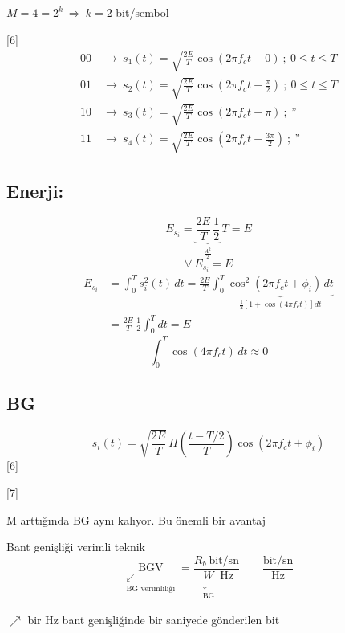 \documentclass[11pt,a4paper]{article}
\begin{document}
\begin{ornek}
$M=4=2^k\ \Rightarrow\ k=2$ bit/sembol
\end{ornek}

[6]
\[
\begin{aligned}
00&\ \rightarrow\ s_1(t)=\sqrt{\tfrac{2E}{T}}\cos(2\pi f_ct+0)\ ;\ 0\le t\le T\\
01&\ \rightarrow\ s_2(t)=\sqrt{\tfrac{2E}{T}}\cos\!\left(2\pi f_ct+\tfrac{\pi}{2}\right)\ ;\ 0\le t\le T\\
10&\ \rightarrow\ s_3(t)=\sqrt{\tfrac{2E}{T}}\cos(2\pi f_ct+\pi)\ ;\ \text{''}\\
11&\ \rightarrow\ s_4(t)=\sqrt{\tfrac{2E}{T}}\cos\!\left(2\pi f_ct+\tfrac{3\pi}{2}\right)\ ;\ \text{''}
\end{aligned}
\]

\subsection{Enerji:}
\[ E_{s_i}=\underbrace{\frac{2E}{T}\,\frac{1}{2}}_{\displaystyle\frac{A^2}{2}}\,T=E \]
\[ \forall\ E_{s_i}=E \]
\begin{align*}
E_{s_i}&=\int_0^T s_i^2(t)\,dt=\frac{2E}{T}\int_0^T\underbrace{\cos^2(2\pi f_ct+\phi_i)\,dt}_{\displaystyle\frac{1}{2}\left[1+\cos(4\pi f_ct)\right]dt}\\
&=\frac{2E}{T}\,\frac{1}{2}\int_0^T dt=E
\end{align*}
\[ \int_0^T\cos(4\pi f_ct)\,dt\approx 0 \]

\subsection{BG}
\[ s_i(t)=\sqrt{\frac{2E}{T}}\,\Pi\!\left(\frac{t-T/2}{T}\right)\cos(2\pi f_ct+\phi_i) \]
[6]

[7]

M arttığında BG aynı kalıyor. Bu önemli bir avantaj

Bant genişliği verimli teknik
\[ \underset{\substack{\swarrow\\ \text{BG verimliliği}}}{\mathrm{BGV}}=\frac{R_b\ \text{bit/sn}}{\underset{\substack{\downarrow\\ \mathrm{BG}}}{W}\ \text{Hz}}\qquad\frac{\text{bit/sn}}{\text{Hz}} \]
\begin{flushright}
$\nearrow$ bir Hz bant genişliğinde bir saniyede gönderilen bit
\end{flushright}
\end{document}
